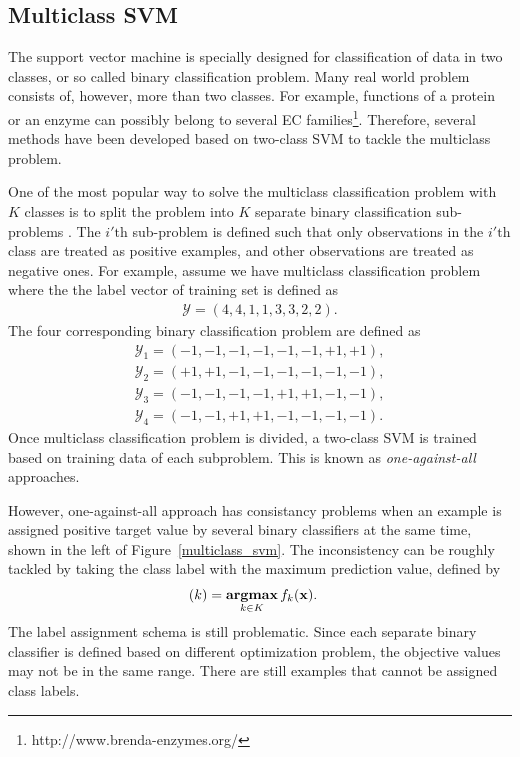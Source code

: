 \documentclass[english]{tktltiki}
\newcommand{\Ycal}{\mathcal{Y}} %
\newcommand{\argmax}{\textbf{argmax}}
\newcommand{\xb}{{\bf x}}
\begin{document}
\subsection{Multiclass SVM}


The support vector machine is specially designed for classification of data in two classes, or so called binary classification problem. Many real world problem consists of, however, more than two classes. For example, functions of a protein or an enzyme can possibly belong to several EC families\footnote{http://www.brenda-enzymes.org/}. Therefore, several methods have been developed based on two-class SVM to tackle the multiclass problem.


One of the most popular way to solve the multiclass classification problem with $K$ classes is to split the problem into $K$ separate binary classification sub-problems \cite{vapnik98}. The $i'\text{th}$ sub-problem is defined such that only observations in the $i'\text{th}$ class are treated as positive examples, and other observations are treated as negative ones. For example, assume we have multiclass classification problem where the the label vector of training set is defined as
\begin{align*}
\Ycal = (4,4,1,1,3,3,2,2). \nonumber
\end{align*}
The four corresponding binary classification problem are defined as
\begin{align*}
\Ycal_1 = (-1,-1,-1,-1,-1,-1,+1,+1), \nonumber \\
\Ycal_2 = (+1,+1,-1,-1,-1,-1,-1,-1), \nonumber \\
\Ycal_3 = (-1,-1,-1,-1,+1,+1,-1,-1), \nonumber \\
\Ycal_4 = (-1,-1,+1,+1,-1,-1,-1,-1). \nonumber
\end{align*}
Once multiclass classification problem is divided, a two-class SVM is trained based on training data of each subproblem. This is known as {\em one-against-all} approaches. 


However, one-against-all approach has consistancy problems when an example is assigned positive target value by several binary classifiers at the same time, shown in the left of Figure~\ref{multiclass_svm}. The inconsistency can be roughly tackled by taking the class label with the maximum prediction value, defined by
\begin{align*}
(k) & = \underset{k \in K}{\operatorname{\argmax}} \, f_k(\xb).
\end{align*}
The label assignment schema is still problematic. Since each separate binary classifier is defined based on different optimization problem, the objective values may not be in the same range. There are still examples that cannot be assigned class labels.
\end{document}
